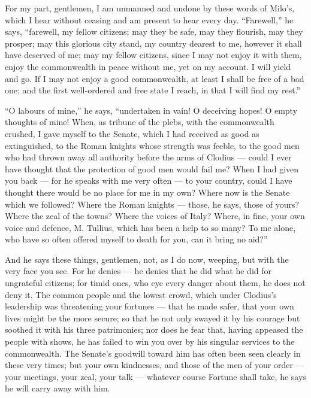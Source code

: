  For my part, gentlemen, I am unmanned and undone by these words of Milo's, which I hear without ceasing and am present to hear every day. ``Farewell,'' he says, ``farewell, my fellow citizens; may they be safe, may they flourish, may they prosper; may this glorious city stand, my country dearest to me, however it shall have deserved of me; may my fellow citizens, since I may not enjoy it with them, enjoy the commonwealth in peace without me, yet on my account. I will yield and go. If I may not enjoy a good commonwealth, at least I shall be free of a bad one; and the first well-ordered and free state I reach, in that I will find my rest.''

 ``O labours of mine,'' he says, ``undertaken in vain! O deceiving hopes! O empty thoughts of mine! When, as tribune of the plebs, with the commonwealth crushed, I gave myself to the Senate, which I had received as good as extinguished, to the Roman knights whose strength was feeble, to the good men who had thrown away all authority before the arms of Clodius --- could I ever have thought that the protection of good men would fail me? When I had given you back --- for he speaks with me very often --- to your country, could I have thought there would be no place for me in my own? Where now is the Senate which we followed? Where the Roman knights --- those, he says, those of yours? Where the zeal of the towns? Where the voices of Italy? Where, in fine, your own voice and defence, M. Tullius, which has been a help to so many? To me alone, who have so often offered myself to death for you, can it bring no aid?''

 And he says these things, gentlemen, not, as I do now, weeping, but with the very face you see. For he denies --- he denies that he did what he did for ungrateful citizens; for timid ones, who eye every danger about them, he does not deny it. The common people and the lowest crowd, which under Clodius's leadership was threatening your fortunes --- that he made safer, that your own lives might be the more secure; so that he not only swayed it by his courage but soothed it with his three patrimonies; nor does he fear that, having appeased the people with shows, he has failed to win you over by his singular services to the commonwealth. The Senate's goodwill toward him has often been seen clearly in these very times; but your own kindnesses, and those of the men of your order --- your meetings, your zeal, your talk --- whatever course Fortune shall take, he says he will carry away with him.

